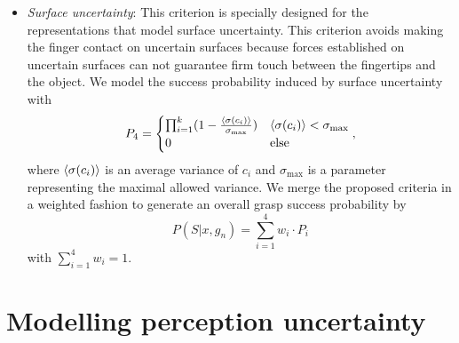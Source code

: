 \begin{itemize}
\item \textit{Surface uncertainty}:
 This criterion is specially designed for the representations that model surface uncertainty. This criterion avoids making the finger contact on uncertain surfaces because forces established on uncertain surfaces can not guarantee firm touch between the fingertips and the object. We model the success probability induced by surface uncertainty with 
\begin{equation}
 P_4 =  \begin{cases}
\prod_{i=1}^{k}(1 -\frac{\left< \sigma(c_i) \right>}{\sigma_{\text{max}} }   )  &  \left< \sigma(c_i) \right> < \sigma_{\text{max}}\\
  0   & \text{else}
\end{cases},
\end{equation} 
where $\left< \sigma(c_i) \right> $ is an average variance of $c_i$ and $\sigma_{\text{max}}$ is a parameter representing the maximal allowed variance. We merge the proposed  criteria in a weighted fashion to generate an overall grasp success probability by  
\begin{equation}
P(S | x , g_n) =  \sum_{i=1}^4 w_i \cdot P_i 
\label{equ:weights}
\end{equation} 
with $\sum_{i=1}^4 w_i  = 1$.
\end{itemize}


\section{Modelling perception uncertainty}



